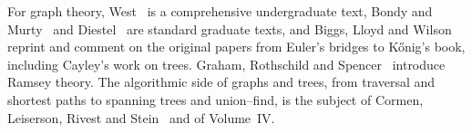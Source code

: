 For graph theory, West~\cite{west2001} is a comprehensive undergraduate text, Bondy and Murty~\cite{bondymurty2008} and Diestel~\cite{diestel2017} are standard graduate texts, and Biggs, Lloyd and Wilson~\cite{biggs1976} reprint and comment on the original papers from Euler's bridges to K\H{o}nig's book, including Cayley's work on trees. Graham, Rothschild and Spencer~\cite{graham1990ramsey} introduce Ramsey theory. The algorithmic side of graphs and trees, from traversal and shortest paths to spanning trees and union--find, is the subject of Cormen, Leiserson, Rivest and Stein~\cite{cormen2022} and of Volume~IV.

\chapterreferences
